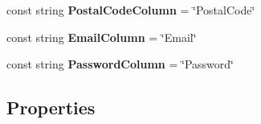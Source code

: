 \begin{DoxyCompactItemize}
\mbox{\label{class_eshop_1_1_customer_a2816d9e395d34978e3e46736521d5bea}} 
const string {\bfseries Postal\+Code\+Column} = \char`\"{}Postal\+Code\char`\"{}
\item 
\mbox{\label{class_eshop_1_1_customer_a8ec3b9bf48844f7cc29b31a4f37d56dd}} 
const string {\bfseries Email\+Column} = \char`\"{}Email\char`\"{}
\item 
\mbox{\label{class_eshop_1_1_customer_af6ec21a2a9e7cf668c918a79aae5b844}} 
const string {\bfseries Password\+Column} = \char`\"{}Password\char`\"{}
\end{DoxyCompactItemize}
\subsection*{Properties}
